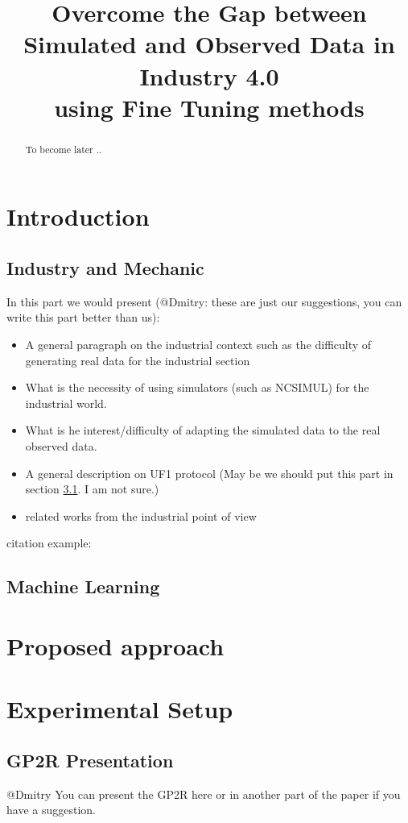 \documentclass{article}
\title{Overcome the Gap between Simulated and Observed Data in Industry 4.0\\ using Fine Tuning methods}
\begin{document}
\maketitle

\begin{abstract}
To become later ..
\end{abstract}

\section{Introduction}

\subsection{Industry and Mechanic}
In this part we would present (@Dmitry: these are just our suggestions, you can write this part better than us):
\begin{itemize}
\item A general paragraph on the industrial context such as the difficulty of generating real data for the industrial section
\item What is the necessity of using simulators (such as NCSIMUL) for the industrial world. 
\item What is he interest/difficulty of adapting the simulated data to the real observed data.
\item A general description on UF1 protocol (May be we should put this part in section \ref{GP2R}. I am not sure.)
\item related works from the industrial point of view
\end{itemize}

citation example: \cite{bowman1993} 
 
\subsection{Machine Learning}


\section{Proposed approach}


\section{Experimental Setup}
\subsection{GP2R Presentation}\label{GP2R}
@Dmitry You can present the GP2R here or in another part of the paper if you have a suggestion.
\end{document}
